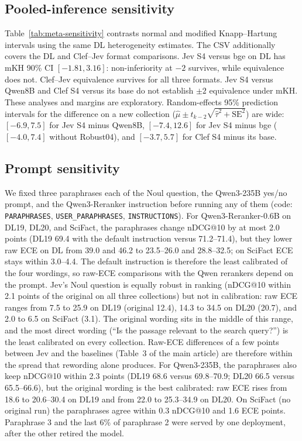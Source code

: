 \subsection{Pooled-inference sensitivity}

Table~\ref{tab:meta-sensitivity} contrasts normal and modified Knapp--Hartung intervals using the same DL heterogeneity estimates. The CSV additionally covers the DL and Clef--Jev format comparisons. Jev S4 versus bge on DL has mKH 90\% CI $[-1.81,3.16]$: non-inferiority at $-2$ survives, while equivalence does not. Clef--Jev equivalence survives for all three formats. Jev S4 versus Qwen8B and Clef S4 versus its base do not establish $\pm2$ equivalence under mKH. These analyses and margins are exploratory. Random-effects 95\% prediction intervals for the difference on a new collection ($\hat\mu\pm t_{k-2}\sqrt{\hat\tau^2+\mathrm{SE}^2}$) are wide: $[-6.9,7.5]$ for Jev S4 minus Qwen8B, $[-7.4,12.6]$ for Jev S4 minus bge ($[-4.0,7.4]$ without Robust04), and $[-3.7,5.7]$ for Clef S4 minus its base.

\subsection{Prompt sensitivity}\label{app:prompts}

We fixed three paraphrases each of the Noul question, the Qwen3-235B yes/no prompt, and the Qwen3-Reranker instruction before running any of them (code: \texttt{PARAPHRASES}, \texttt{USER\_PARAPHRASES}, \texttt{INSTRUCTIONS}). For Qwen3-Reranker-0.6B on DL19, DL20, and SciFact, the paraphrases change nDCG@10 by at most 2.0 points (DL19 69.4 with the default instruction versus 71.2--71.4), but they lower raw ECE on DL from 39.0 and 46.2 to 23.5--26.0 and 28.8--32.5; on SciFact ECE stays within 3.0--4.4. The default instruction is therefore the least calibrated of the four wordings, so raw-ECE comparisons with the Qwen rerankers depend on the prompt. Jev's Noul question is equally robust in ranking (nDCG@10 within 2.1 points of the original on all three collections) but not in calibration: raw ECE ranges from 7.5 to 25.9 on DL19 (original 12.4), 14.3 to 34.5 on DL20 (20.7), and 2.0 to 6.5 on SciFact (3.1). The original wording sits in the middle of this range, and the most direct wording (``Is the passage relevant to the search query?'') is the least calibrated on every collection. Raw-ECE differences of a few points between Jev and the baselines (Table~3 of the main article) are therefore within the spread that rewording alone produces. For Qwen3-235B, the paraphrases also keep nDCG@10 within 2.3 points (DL19 68.6 versus 69.8--70.9; DL20 66.5 versus 65.5--66.6), but the original wording is the best calibrated: raw ECE rises from 18.6 to 20.6--30.4 on DL19 and from 22.0 to 25.3--34.9 on DL20. On SciFact (no original run) the paraphrases agree within 0.3 nDCG@10 and 1.6 ECE points. Paraphrase 3 and the last 6\% of paraphrase 2 were served by one deployment, after the other retired the model.

